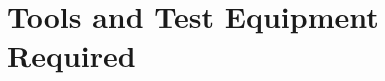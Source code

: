 \documentclass[\mainpath/main]{subfiles}
\begin{document}
\chapter{Tools and Test Equipment Required} %
\label{ToolsAndTestEquipmentRequired}

\setmyfancystyle
\end{document}
